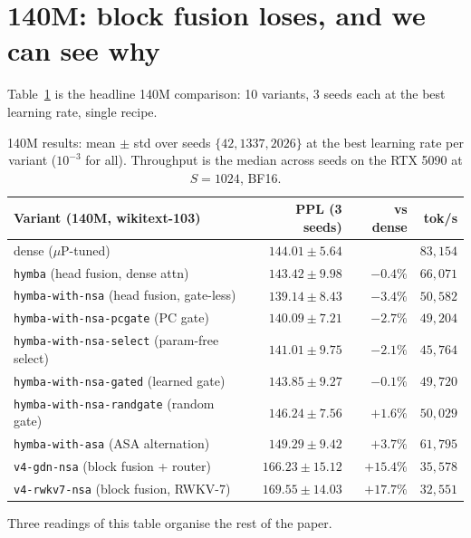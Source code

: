 \documentclass[11pt,a4paper]{article}
\begin{document}
\section{140M: block fusion loses, and we can see why}
\label{sec:exp-140m}

Table~\ref{tab:140m} is the headline 140M comparison: 10 variants, 3 seeds
each at the best learning rate, single recipe.

\begin{table}[t]
\centering
\begin{tabular}{lrrr}
\toprule
Variant (140M, wikitext-103) & PPL (3 seeds) & vs dense & tok/s \\
\midrule
dense ($\mu$P-tuned) & $144.01 \pm 5.64$ & & $83{,}154$ \\
\midrule
\texttt{hymba} (head fusion, dense attn) & $143.42 \pm 9.98$ & $-0.4\%$ & $66{,}071$ \\
\texttt{hymba-with-nsa} (head fusion, gate-less) & $\mathbf{139.14 \pm 8.43}$ & $\mathbf{-3.4\%}$ & $50{,}582$ \\
\texttt{hymba-with-nsa-pcgate} (PC gate) & $140.09 \pm 7.21$ & $-2.7\%$ & $49{,}204$ \\
\texttt{hymba-with-nsa-select} (param-free select) & $141.01 \pm 9.75$ & $-2.1\%$ & $45{,}764$ \\
\texttt{hymba-with-nsa-gated} (learned gate) & $143.85 \pm 9.27$ & $-0.1\%$ & $49{,}720$ \\
\texttt{hymba-with-nsa-randgate} (random gate) & $146.24 \pm 7.56$ & $+1.6\%$ & $50{,}029$ \\
\texttt{hymba-with-asa} (ASA alternation) & $149.29 \pm 9.42$ & $+3.7\%$ & $61{,}795$ \\
\midrule
\texttt{v4-gdn-nsa} (block fusion + router) & $166.23 \pm 15.12$ & $+15.4\%$ & $35{,}578$ \\
\texttt{v4-rwkv7-nsa} (block fusion, RWKV-7) & $169.55 \pm 14.03$ & $+17.7\%$ & $32{,}551$ \\
\bottomrule
\end{tabular}
\caption{140M results: mean $\pm$ std over seeds $\{42,1337,2026\}$ at the
best learning rate per variant ($10^{-3}$ for all). Throughput is the
median across seeds on the RTX 5090 at $S{=}1024$, BF16.}
\label{tab:140m}
\end{table}

Three readings of this table organise the rest of the paper.
\end{document}
